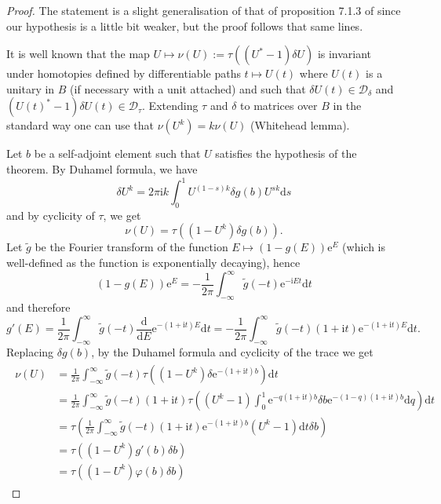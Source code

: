 \documentclass[11pt]{amsart}
\begin{document}
\begin{proof}
	The statement is a slight generalisation of that of proposition 7.1.3 of \cite{prodan2016bulk} since our hypothesis is a little bit weaker, but the proof follows that same lines. 
	
	It is well known that the map $U\mapsto \nu(U):=\tau((U^*-1) \delta U)$ is invariant under homotopies defined by differentiable paths $t\mapsto U(t)$ where $U(t)$ is a unitary in $B$ (if necessary with a unit attached) and such that $\delta U(t)\in \mathcal{D}_\delta$ and $(U(t)^*-1)\delta U(t)\in \mathcal{D}_\tau$. Extending $\tau$ and $\delta$ to matrices over $B$ in the standard way one can use that $\nu(U^k) = k \nu(U)$ (Whitehead lemma).
	
	Let $b$ be a self-adjoint element such that $U$ satisfies the hypothesis of the theorem.
	By Duhamel formula, we have
	$$\delta U^k=2\pi\mathrm{i}k\int_0^1U^{(1-s)k}\delta g(b)U^{sk}\mathrm{d}s$$
	and by cyclicity of $\tau$, we get
	$$\nu(U)=\tau((1-U^k)\delta g(b)).$$
	Let $\tilde g$ be the Fourier transform of the function $E\mapsto (1-g(E))\mathrm{e}^E$ (which is well-defined as the function is exponentially decaying), hence
	$$(1-g(E))\mathrm{e}^E=-\frac{1}{2\pi}\int_{-\infty}^\infty \tilde{g}(-t)\mathrm{e}^{-\mathrm{i}Et}\mathrm{d}t$$
	and therefore
	$$g'(E)=\frac{1}{2\pi}\int_{-\infty}^\infty \tilde{g}(-t)\frac{\mathrm{d}}{\mathrm{d}E}\mathrm{e}^{-(1+\mathrm{i}t)E}\mathrm{d}t=-\frac{1}{2\pi}\int_{-\infty}^\infty \tilde{g}(-t)(1+\mathrm{i}t)\mathrm{e}^{-(1+\mathrm{i}t)E}\mathrm{d}t.$$
	Replacing $\delta g(b)$, by the Duhamel formula and cyclicity of the trace we get
	\begin{align*}
		\begin{split}
			\nu(U)&=\frac{1}{2\pi}\int_{-\infty}^\infty \tilde{g}(-t)\tau\left((1-U^k)\delta \mathrm{e}^{-(1+\mathrm{i}t)b}\right)\mathrm{d}t\\
			&=\frac{1}{2\pi}\int_{-\infty}^\infty \tilde{g}(-t)(1+\mathrm{i}t)\tau\left((U^k-1) \int_0^1 \mathrm{e}^{-q(1+\mathrm{i}t)b}\delta b\mathrm{e}^{-(1-q)(1+\mathrm{i}t)b}\mathrm{d}q\right)\mathrm{d}t\\
			&= \tau\left(\frac{1}{2\pi}\int_{-\infty}^\infty \tilde{g}(-t)(1+\mathrm{i}t)\mathrm{e}^{-(1+\mathrm{i}t)b}(U^k-1)\mathrm{d}t\delta b \right)\\
			&= \tau\left((1-U^k)g'(b)\delta b \right)\\
			&= \tau\left((1-U^k)\varphi(b)\delta b \right)
		\end{split}
	\end{align*}

\end{proof}
\end{document}
